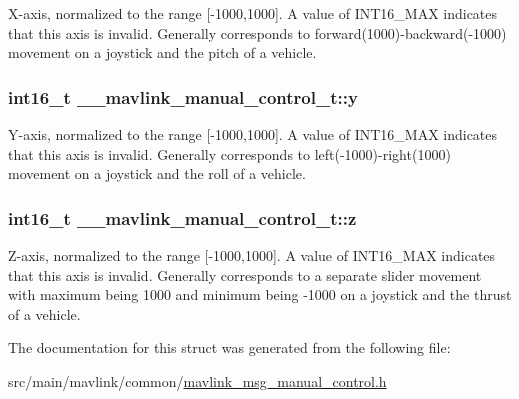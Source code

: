 X-\/axis, normalized to the range \mbox{[}-\/1000,1000\mbox{]}. A value of I\+N\+T16\+\_\+\+M\+A\+X indicates that this axis is invalid. Generally corresponds to forward(1000)-\/backward(-\/1000) movement on a joystick and the pitch of a vehicle. 

\hypertarget{struct____mavlink__manual__control__t_a5f705735ffdbe9c373151fe73c0abedb}{
\subsubsection[{y}]{\setlength{\rightskip}{0pt plus 5cm}int16\+\_\+t \+\_\+\+\_\+mavlink\+\_\+manual\+\_\+control\+\_\+t\+::y}}\label{struct____mavlink__manual__control__t_a5f705735ffdbe9c373151fe73c0abedb}


Y-\/axis, normalized to the range \mbox{[}-\/1000,1000\mbox{]}. A value of I\+N\+T16\+\_\+\+M\+A\+X indicates that this axis is invalid. Generally corresponds to left(-\/1000)-\/right(1000) movement on a joystick and the roll of a vehicle. 

\hypertarget{struct____mavlink__manual__control__t_a9e3fd9d9bcd622e31cca4d44f66343c1}{
\subsubsection[{z}]{\setlength{\rightskip}{0pt plus 5cm}int16\+\_\+t \+\_\+\+\_\+mavlink\+\_\+manual\+\_\+control\+\_\+t\+::z}}\label{struct____mavlink__manual__control__t_a9e3fd9d9bcd622e31cca4d44f66343c1}


Z-\/axis, normalized to the range \mbox{[}-\/1000,1000\mbox{]}. A value of I\+N\+T16\+\_\+\+M\+A\+X indicates that this axis is invalid. Generally corresponds to a separate slider movement with maximum being 1000 and minimum being -\/1000 on a joystick and the thrust of a vehicle. 



The documentation for this struct was generated from the following file\+:\begin{DoxyCompactItemize}
\item 
src/main/mavlink/common/\hyperlink{mavlink__msg__manual__control_8h}{mavlink\+\_\+msg\+\_\+manual\+\_\+control.\+h}\end{DoxyCompactItemize}
